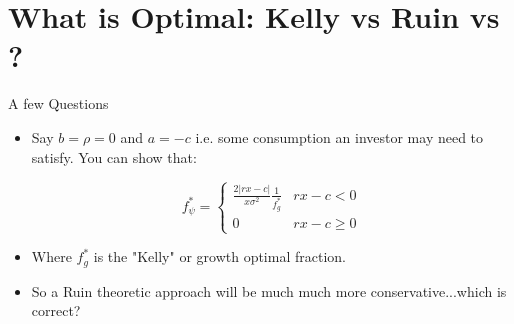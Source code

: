\documentclass[11pt]{beamer}
\begin{document}
\section{What is Optimal: Kelly vs Ruin vs ?}
\begin{frame}{A few Questions}

\begin{itemize}

\item Say $b=\rho=0$ and $a=-c$ i.e. some consumption an investor may need to satisfy. You can show that:

$$f_{\psi}^* = \begin{cases} 
      \frac{2|rx-c|}{x\sigma^2}\frac{ 1 }{f_{g}^{*}} & rx-c<0 \\
      0 & rx-c \geq 0
   \end{cases}$$
   
\vfill
\item Where $f_{g}^{*}$ is the "Kelly" or growth optimal fraction. 
   
\vfill
\item So a Ruin theoretic approach will be much much more conservative...which is correct?

\end{itemize}

\end{frame}
\end{document}
